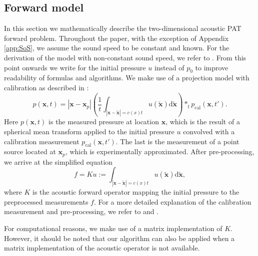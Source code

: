\documentclass[journal]{IEEEtran}
\newcommand{\hl}[1]{\cbcolor{red}\begin{changebar}{\color{red} #1}\end{changebar}}
\begin{document}
\subsection{Forward model}\label{sec:fw_model}
In this section we mathematically describe the {two-dimensional} acoustic PAT forward problem. {Throughout the paper, with the exception of Appendix \ref{app:SoS}, we assume the sound speed to be constant and known. For the derivation of the model with non-constant sound speed, we refer to \cite[section 5.3]{Willemink2010}.} From this point onwards we write for the initial pressure $u$ instead of $p_0$ to improve readability of formulas and algorithms. We make use of a projection model with calibration as described in \cite{Wang2004}:
{\begin{equation}\label{eq:FW_full}
p(\mathbf{x},t) = |\mathbf{x}-\mathbf{x}_p|\left(\frac{1}{t}\int_{|\mathbf{x}-\tilde{\mathbf{x}}|=c(x)t} u(\tilde{\mathbf{x}})\text{d} \tilde{\mathbf{x}}\right)\ast_t p_\text{cal}\left(\mathbf{x},t'\right).
\end{equation}}
Here $p(\mathbf{x},t)$ is the measured pressure at location $\mathbf{x}$, which is the result of a spherical mean transform \cite{Kruger1995} applied to the initial pressure $u$ convolved with a calibration measurement $p_\text{cal}\left(\mathbf{x},t'\right)$. The last is the measurement of a point source located at $\mathbf{x}_p$, which is experimentally approximated. After pre-processing, we arrive at the simplified equation 
{\begin{equation}\label{eq:FW_prep}
f = Ku:=\int_{|\mathbf{x}-\tilde{\mathbf{x}}|=c(x)t} u(\tilde{\mathbf{x}})\text{d} \tilde{\mathbf{x}},
\end{equation}}
where $K$ is the acoustic forward operator mapping the initial pressure to the preprocessed measurements $f$. For a more detailed explanation of the calibration measurement and pre-processing, we refer to \cite[Chapter 2]{Willemink2010} and \cite{Boink2018}. \hl{For computational reasons, we make use of a matrix implementation of $K$. However, it should be noted that our algorithm can also be applied when a matrix implementation of the acoustic operator is not available.}
\end{document}
